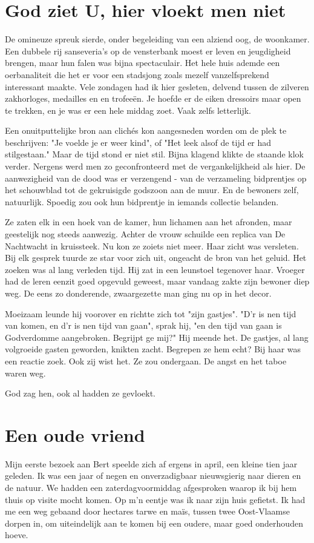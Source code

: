 \documentclass[12pt, justified, a4paper, symmetric]{tufte-book}
\begin{document}
\section{God ziet U, hier vloekt men niet}
De omineuze spreuk sierde, onder begeleiding van een alziend oog, de woonkamer. Een dubbele rij sanseveria's op de vensterbank moest er leven en jeugdigheid brengen, maar hun falen was bijna spectaculair. Het hele huis ademde een oerbanaliteit die het er voor een stadsjong zoals mezelf vanzelfsprekend interessant maakte. Vele zondagen had ik hier gesleten, delvend tussen de zilveren zakhorloges, medailles en en trofee\"en. Je hoefde er de eiken dressoirs maar open te trekken, en je was er een hele middag zoet. Vaak zelfs letterlijk.

Een onuitputtelijke bron aan clich\'es kon aangesneden worden om de plek te beschrijven: "Je voelde je er weer kind", of "Het leek alsof de tijd er had stilgestaan." Maar de tijd stond er niet stil. Bijna klagend klikte de staande klok verder. Nergens werd men zo geconfronteerd met de vergankelijkheid als hier. De aanwezigheid van de dood was er verzengend - van de verzameling bidprentjes op het schouwblad tot de gekruisigde godszoon aan de muur. En de bewoners zelf, natuurlijk. Spoedig zou ook hun bidprentje in iemands collectie belanden.

Ze zaten elk in een hoek van de kamer, hun lichamen aan het afronden, maar geestelijk nog steeds aanwezig. Achter de vrouw schuilde een replica van De Nachtwacht in kruissteek. Nu kon ze zoiets niet meer. Haar zicht was versleten. Bij elk gesprek tuurde ze star voor zich uit, ongeacht de bron van het geluid. Het zoeken was al lang verleden tijd. Hij zat in een leunstoel tegenover haar. Vroeger had de leren eenzit goed opgevuld geweest, maar vandaag zakte zijn bewoner diep weg. De eens zo donderende, zwaargezette man ging nu op in het decor.

Moeizaam leunde hij voorover en richtte zich tot "zijn gastjes". "D'r is nen tijd van komen, en d'r is nen tijd van gaan", sprak hij, "en den tijd van gaan is Godverdomme aangebroken. Begrijpt ge mij?" Hij meende het. De gastjes, al lang volgroeide gasten geworden, knikten zacht. Begrepen ze hem echt? Bij haar was een reactie zoek. Ook zij wist het. Ze zou ondergaan. De angst en het taboe waren weg.

God zag hen, ook al hadden ze gevloekt.

\newpage
\section{Een oude vriend}
Mijn eerste bezoek aan Bert speelde zich af ergens in april, een kleine tien jaar geleden. Ik was een jaar of negen en onverzadigbaar nieuwsgierig naar dieren en de natuur. We hadden een zaterdagvoormiddag afgesproken waarop ik bij hem thuis op visite mocht komen. Op m'n eentje was ik naar zijn huis gefietst. Ik had me een weg gebaand door hectares tarwe en ma\"is, tussen twee Oost-Vlaamse dorpen in, om uiteindelijk aan te komen bij een oudere, maar goed onderhouden hoeve.
\end{document}

